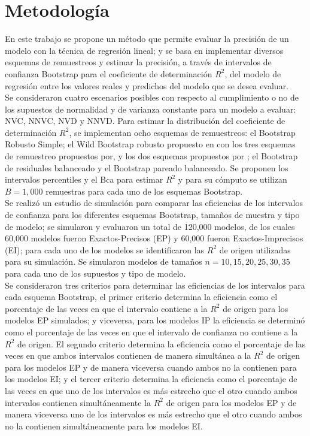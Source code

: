 \section{Metodología}
En este trabajo se propone un método que permite evaluar la precisión de un modelo con la técnica de regresión lineal; y se basa en implementar diversos esquemas de remuestreos y estimar la precisión, a través de intervalos de confianza Bootstrap para el coeficiente de determinación $R^2$, del modelo de regresión entre los valores reales y predichos del modelo que se desea evaluar.\\

Se consideraron cuatro escenarios posibles con respecto al cumplimiento o no de los supuestos de normalidad y de varianza constante para un modelo a evaluar: NVC, NNVC, NVD y NNVD. Para estimar la distribución del coeficiente de determinación $R^2$, se implementan ocho esquemas de remuestreos: el Bootstrap Robusto Simple; el Wild Bootstrap robusto propuesto en \textcite{rana-2012} con los tres esquemas de remuestreo propuestos por\textcite{wu-1986}, y los dos esquemas propuestos por \textcite{wu-1986}; el Bootstrap de residuales balanceado y el Bootstrap pareado balanceado. Se proponen los intervalos percentiles y el Bca para estimar $R^2$ y para su cómputo se utilizan $B=1,000$ remuestras para cada uno de los esquemas Bootstrap.\\ 

Se realizó un estudio de simulación para comparar las eficiencias de los intervalos de confianza para los diferentes esquemas Bootstrap, tamaños de muestra y tipo de modelo; se simularon y evaluaron un total de 120,000 modelos, de los cuales 60,000 modelos fueron Exactos-Precisos (EP) y 60,000 fueron Exactos-Imprecisos (EI); para cada uno de los modelos se identificaron las $R^2$ de origen utilizadas para su simulación. Se simularon modelos de tamaños $n=10, 15, 20, 25, 30, 35$ para cada uno de los supuestos y tipo de modelo.\\  

Se consideraron tres criterios para determinar las eficiencias de los intervalos para cada esquema Bootstrap, el primer criterio determina la eficiencia como el porcentaje de las veces en que el intervalo contiene a la $R^2$ de origen para los modelos EP simulados; y viceversa, para los modelos IP la eficiencia se determinó como el porcentaje de las veces en que el intervalo de confianza no contiene a la $R^2$ de origen. El segundo criterio determina la eficiencia como el porcentaje de las veces en que ambos intervalos contienen de manera simultánea a la $R^2$ de origen para los modelos EP y de manera viceversa cuando ambos no la contienen para los modelos EI; y el tercer criterio determina la eficiencia como el porcentaje de las veces en que uno de los intervalos es más estrecho que el otro cuando ambos intervalos contienen simultáneamente la $R^2$ de origen para los modelos EP y de manera viceversa uno de los intervalos es más estrecho que el otro cuando ambos no la contienen simultáneamente para los modelos EI.\\

